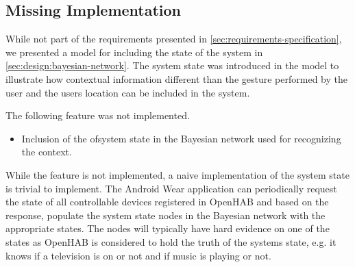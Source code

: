 \subsection{Missing Implementation}

While not part of the requirements presented in \cref{sec:requirements-specification}, we presented a model for including the state of the system in \cref{sec:design:bayesian-network}. The system state was introduced in the model to illustrate how contextual information different than the gesture performed by the user and the users location can be included in the system.

The following feature was not implemented.

\begin{itemize}
\item Inclusion of the ofsystem state in the Bayesian network used for recognizing the context.
\end{itemize}

While the feature is not implemented, a naive implementation of the system state is trivial to implement. The Android Wear application can periodically request the state of all controllable devices registered in OpenHAB and based on the response, populate the system state nodes in the Bayesian network with the appropriate states. The nodes will typically have hard evidence on one of the states as OpenHAB is considered to hold the truth of the systems state, e.g. it knows if a television is on or not and if music is playing or not.

